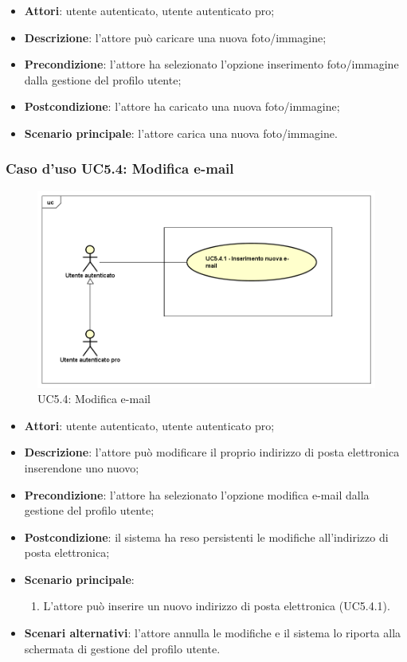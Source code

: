 \begin{itemize}
	\item \textbf{Attori}: utente autenticato, utente autenticato pro;
	\item \textbf{Descrizione}: l'attore può caricare una nuova foto/immagine;
	\item \textbf{Precondizione}: l'attore ha selezionato l'opzione inserimento foto/immagine dalla gestione del profilo utente;  
	\item \textbf{Postcondizione}: l'attore ha caricato una nuova foto/immagine;
	\item \textbf{Scenario principale}: l'attore carica una nuova foto/immagine.
\end{itemize}

\subsubsection{Caso d'uso UC5.4: Modifica e-mail}
\label{UC5.4}
\begin{figure}[h]
	\centering
	\includegraphics[scale=0.5,keepaspectratio]{UML/UC5_4.png}
	\caption{UC5.4: Modifica e-mail}
\end{figure}

\begin{itemize}
	\item \textbf{Attori}: utente autenticato, utente autenticato pro;
	\item \textbf{Descrizione}: l'attore può modificare il proprio indirizzo di posta elettronica inserendone uno nuovo;
	\item \textbf{Precondizione}:  l'attore ha selezionato l'opzione modifica e-mail dalla gestione del profilo utente; 
	\item \textbf{Postcondizione}: il sistema ha reso persistenti le modifiche all'indirizzo di posta elettronica;
	\item \textbf{Scenario principale}:
		\begin{enumerate}
			\item L'attore può inserire un nuovo indirizzo di posta elettronica (UC5.4.1).
		\end{enumerate}
	\item \textbf{Scenari alternativi}: l'attore annulla le modifiche e il sistema lo riporta alla schermata di gestione del profilo utente.
\end{itemize}


